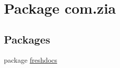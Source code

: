 \hypertarget{namespacecom_1_1zia}{\section{Package com.\-zia}
\label{namespacecom_1_1zia}
}
\subsection*{Packages}
\begin{DoxyCompactItemize}
\item 
package \hyperlink{namespacecom_1_1zia_1_1freshdocs}{freshdocs}
\end{DoxyCompactItemize}
